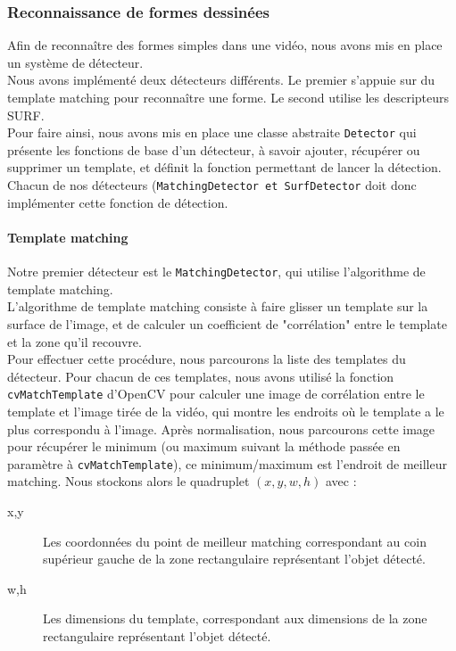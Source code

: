 \subsubsection{Reconnaissance de formes dessinées}

Afin de reconnaître des formes simples dans une vidéo, nous avons mis en place un système de détecteur.\\

Nous avons implémenté deux détecteurs différents. Le premier s'appuie sur du template matching pour reconnaître une forme. Le second utilise les descripteurs SURF.\\

Pour faire ainsi, nous avons mis en place une classe abstraite \texttt{Detector} qui présente les fonctions de base d'un détecteur, à savoir ajouter, récupérer ou supprimer un template, et définit la fonction permettant de lancer la détection.
Chacun de nos détecteurs (\texttt{MatchingDetector et SurfDetector} doit donc implémenter cette fonction de détection.

\paragraph{Template matching\vspace{0.5cm}\\}

Notre premier détecteur est le \texttt{MatchingDetector}, qui utilise l'algorithme de template matching.\\

L'algorithme de template matching consiste à faire glisser un template sur la surface de l'image, et de calculer un coefficient de "corrélation" entre le template et la zone qu'il recouvre.\\

Pour effectuer cette procédure, nous parcourons la liste des templates du détecteur. Pour chacun de ces templates, nous avons utilisé la fonction \texttt{cvMatchTemplate} d'OpenCV pour calculer une image de corrélation entre le template et l'image tirée de la vidéo, qui montre les endroits où le template a le plus correspondu à l'image. Après normalisation, nous parcourons cette image pour récupérer le minimum (ou maximum suivant la méthode passée en paramètre à \texttt{cvMatchTemplate}), ce minimum/maximum est l'endroit de meilleur matching. Nous stockons alors le quadruplet $(x,y,w,h)$ avec :
\begin{description}
\item[x,y] Les coordonnées du point de meilleur matching correspondant au coin supérieur gauche de la zone rectangulaire représentant l'objet détecté.
\item[w,h] Les dimensions du template, correspondant aux dimensions de la zone rectangulaire représentant l'objet détecté.\\
\end{description}

